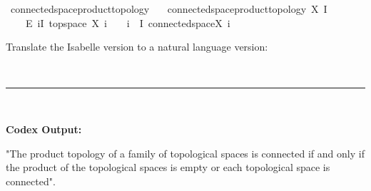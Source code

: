 \documentclass{article}
\begin{document}
\begin{boxB}
\begin{isabelle}
\isamarkupfalse \ connected{\isacharunderscore}{\kern0pt}space{\isacharunderscore}{\kern0pt}product{\isacharunderscore}{\kern0pt}topology{\isacharcolon}{\kern0pt}\isanewline
\ \ \ {\isachardoublequoteopen}connected{\isacharunderscore}{\kern0pt}space{\isacharparenleft}{\kern0pt}product{\isacharunderscore}{\kern0pt}topology\ X\ I{\isacharparenright}{\kern0pt}\ {\isasymlongleftrightarrow}\isanewline
\ \ \ \ {\isacharparenleft}{\kern0pt}{\isasymPi}\isactrlsub E\ i{\isasymin}I{\isachardot}{\kern0pt}\ topspace\ {\isacharparenleft}{\kern0pt}X\ i{\isacharparenright}{\kern0pt}{\isacharparenright}{\kern0pt}\ {\isacharequal}{\kern0pt}\ {\isacharbraceleft}{\kern0pt}{\isacharbraceright}{\kern0pt}\ {\isasymor}\ {\isacharparenleft}{\kern0pt}{\isasymforall}i\ {\isasymin}\ I{\isachardot}{\kern0pt}\ connected{\isacharunderscore}{\kern0pt}space{\isacharparenleft}{\kern0pt}X\ i{\isacharparenright}{\kern0pt}{\isacharparenright}{\kern0pt}{\isachardoublequoteclose}
\end{isabelle}
Translate the Isabelle version to a natural language version:

\
\hrule
\

\textbf{Codex Output:}

"The product topology of a family of topological spaces is connected if and only if the product of the topological spaces is empty or each topological space is connected".
\end{boxB}
\end{document}
